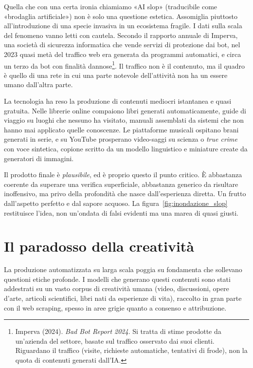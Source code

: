 Quella che con una certa ironia chiamiamo «AI slop» (traducibile come «brodaglia artificiale») non è solo una questione estetica. Assomiglia piuttosto all'introduzione di una specie invasiva in un ecosistema fragile. I dati sulla scala del fenomeno vanno letti con cautela. Secondo il rapporto annuale di Imperva, una società di sicurezza informatica che vende servizi di protezione dai bot, nel 2023 quasi metà del traffico web era generata da programmi automatici, e circa un terzo da bot con finalità dannose\footnote{Imperva (2024). \textit{Bad Bot Report 2024}. Si tratta di stime prodotte da un'azienda del settore, basate sul traffico osservato dai suoi clienti. Riguardano il traffico (visite, richieste automatiche, tentativi di frode), non la quota di contenuti generati dall'IA.}. Il traffico non è il contenuto, ma il quadro è quello di una rete in cui una parte notevole dell'attività non ha un essere umano dall'altra parte.


La tecnologia ha reso la produzione di contenuti mediocri istantanea e quasi gratuita. Nelle librerie online compaiono libri generati automaticamente, guide di viaggio su luoghi che nessuno ha visitato, manuali assemblati da sistemi che non hanno mai applicato quelle conoscenze. Le piattaforme musicali ospitano brani generati in serie, e su YouTube prosperano video-saggi su scienza o \textit{true crime} con voce sintetica, copione scritto da un modello linguistico e miniature create da generatori di immagini.

Il prodotto finale è \textit{plausibile}, ed è proprio questo il punto critico. È abbastanza coerente da superare una verifica superficiale, abbastanza generico da risultare inoffensivo, ma privo della profondità che nasce dall'esperienza diretta. Un frutto dall'aspetto perfetto e dal sapore acquoso. La figura~\ref{fig:inondazione_slop} restituisce l'idea, non un'ondata di falsi evidenti ma una marea di quasi giusti.


\section{Il paradosso della creatività}

La produzione automatizzata su larga scala poggia su fondamenta che sollevano questioni etiche profonde. I modelli che generano questi contenuti sono stati addestrati su un vasto corpus di creatività umana (video, discussioni, opere d'arte, articoli scientifici, libri nati da esperienze di vita), raccolto in gran parte con il web scraping, spesso in aree grigie quanto a consenso e attribuzione.

